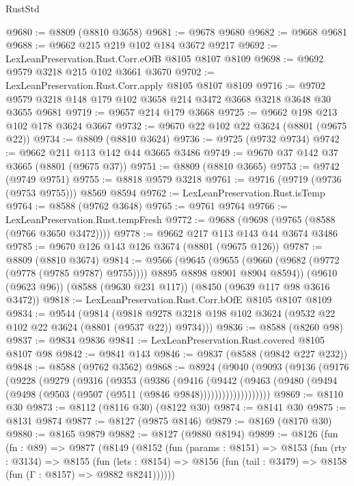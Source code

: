\begin{lexlean}{RustStd}
\begin{coremodule}
@9680 := @8809 (@8810 @3658)
@9681 := @9678 @9680
@9682 := @9668 @9681
@9688 := @9662 @215 @219 @102 @184 @3672 @9217
@9692 := LexLeanPreservation.Rust.Corr.eOfB @8105 @8107 @8109
@9698 := @9692 @9579 @3218 @215 @102 @3661 @3670
@9702 := LexLeanPreservation.Rust.Corr.apply @8105 @8107 @8109
@9716 := @9702 @9579 @3218 @148 @179 @102 @3658 @214 @3472 @3668 @3218 @3648 @30 @3655 @9681
@9719 := @9657 @214 @179 @3668
@9725 := @9662 @198 @213 @102 @178 @3624 @3667
@9732 := @9670 @22 @102 @22 @3624 (@8801 (@9675 @22))
@9734 := @8809 (@8810 @3624)
@9736 := @9725 (@9732 @9734)
@9742 := @9662 @211 @113 @142 @44 @3665 @3486
@9749 := @9670 @37 @142 @37 @3665 (@8801 (@9675 @37))
@9751 := @8809 (@8810 @3665)
@9753 := @9742 (@9749 @9751)
@9755 := @8818 @9579 @3218
@9761 := @9716 (@9719 (@9736 (@9753 @9755))) @8569 @8594
@9762 := LexLeanPreservation.Rust.isTemp
@9764 := @8588 (@9762 @3648)
@9765 := @9761 @9764
@9766 := LexLeanPreservation.Rust.tempFresh
@9772 := @9688 (@9698 (@9765 (@8588 (@9766 @3650 @3472))))
@9778 := @9662 @217 @113 @143 @44 @3674 @3486
@9785 := @9670 @126 @143 @126 @3674 (@8801 (@9675 @126))
@9787 := @8809 (@8810 @3674)
@9814 := @9566
    (@9645
      (@9655 (@9660 (@9682 (@9772 (@9778 (@9785 @9787) @9755)))) @8895 @8898 @8901 @8904 @8594))
    (@9610 (@9623 @96))
    (@8588 (@9630 @231 @117))
    (@8450 (@9639 @117 @98 @3616 @3472))
@9818 := LexLeanPreservation.Rust.Corr.bOfE @8105 @8107 @8109
@9834 := @9544
    (@9814 (@9818 @9278 @3218 @198 @102 @3624 (@9532 @22 @102 @22 @3624 (@8801 (@9537 @22)) @9734)))
@9836 := @8588 (@8260 @98)
@9837 := @9834 @9836
@9841 := LexLeanPreservation.Rust.covered @8105 @8107 @98
@9842 := @9841 @143
@9846 := @9837 (@8588 (@9842 @227 @232))
@9848 := @8588 (@9762 @3562)
@9868 := @8924
    (@9040
      (@9093
        (@9136
          (@9176
            (@9228
              (@9279
                (@9316
                  (@9353
                    (@9386
                      (@9416
                        (@9442
                          (@9463
                            (@9480
                              (@9494 (@9498 (@9503 (@9507 (@9511 (@9846 @9848)))))))))))))))))))
@9869 := @8110 @30
@9873 := @8112 (@8116 @30) (@8122 @30)
@9874 := @8141 @30
@9875 := @8131 @9874
@9877 := @8127 (@9875 @8146)
@9879 := @8169 (@8170 @30)
@9880 := @8165 @9879
@9882 := @8127 (@9880 @8194)
@9899 := @8126
    (fun (fn : @89) =>
    @9877
      (@8149
        (@8152
          (fun (params : @8151) =>
          @8153
            (fun (rty : @3134) =>
            @8155
              (fun (lets : @8154) =>
              @8156 (fun (tail : @3479) => @8158 (fun (Γ : @8157) => @9882 @8241))))))

\end{coremodule}
\end{lexlean}
